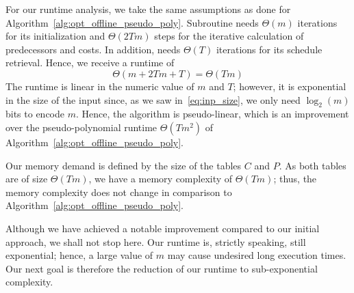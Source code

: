 For our runtime analysis, we take the same assumptions as done for Algorithm~\ref{alg:opt_offline_pseudo_poly}. Subroutine  needs $\Theta(m)$ iterations for its initialization and $\Theta(2Tm)$ steps for the iterative calculation of predecessors and costs. In addition,  needs $\Theta(T)$ iterations for its schedule retrieval. Hence, we receive a runtime of 
\begin{equation*}
	\Theta(m+2Tm+T)=\Theta(Tm)
\end{equation*}
The runtime is linear in the numeric value of $m$ and $T$; however, it is exponential in the size of the input since, as we saw in~\eqref{eq:inp_size}, we only need $\log_2(m)$ bits to encode $m$. Hence, the algorithm is pseudo-linear, which is an improvement over the pseudo-polynomial runtime $\Theta(Tm^2)$ of Algorithm~\ref{alg:opt_offline_pseudo_poly}.

Our memory demand is defined by the size of the tables $C$ and $P$. As both tables are of size $\Theta(Tm)$, we have a memory complexity of $\Theta(Tm)$; thus, the memory complexity does not change in comparison to Algorithm~\ref{alg:opt_offline_pseudo_poly}.

Although we have achieved a notable improvement compared to our initial approach, we shall not stop here. Our runtime is, strictly speaking, still exponential; hence, a large value of $m$ may cause undesired long execution times. Our next goal is therefore the reduction of our runtime to sub-exponential complexity.
